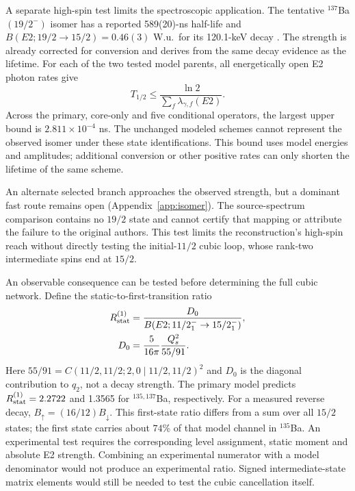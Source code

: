 \documentclass[pdflatex,iicol,sn-mathphys-num]{sn-jnl}
\begin{document}
A separate high-spin test limits the spectroscopic application.
The tentative $^{137}$Ba $(19/2^-)$ isomer has a reported
589(20)-ns half-life and $B(E2;19/2\to15/2)=0.46(3)$ W.u.\
for its 120.1-keV decay \cite{Vogt2017PRC95_024316}.
The strength is already corrected for conversion and derives from
the same decay evidence as the lifetime.
For each of the two tested model parents, all energetically open
E2 photon rates give
\begin{equation}
T_{1/2}\leq\frac{\ln2}{\sum_f\lambda_{\gamma,f}(E2)}.
\label{eq:isomerbound}
\end{equation}
Across the primary, core-only and five conditional operators,
the largest upper bound is $2.811\times10^{-4}$ ns.
The unchanged modeled schemes cannot represent the observed isomer
under these state identifications. This bound uses model energies
and amplitudes; additional conversion or other positive rates can
only shorten the lifetime of the same scheme.

An alternate selected branch approaches the observed strength,
but a dominant fast route remains open (Appendix~\ref{app:isomer}).
The source-spectrum comparison contains no $19/2$ state and cannot
certify that mapping or attribute the failure to the original authors.
This test limits the reconstruction's high-spin reach without
directly testing the initial-$11/2$ cubic loop, whose rank-two
intermediate spins end at $15/2$.

An observable consequence can be tested before determining the full cubic
network. Define the static-to-first-transition ratio
\begin{equation}
\begin{aligned}
R_{\rm stat}^{(1)}
&=\frac{D_0}{B(E2;11/2_1^-\to15/2_1^-)},\\
D_0&=\frac5{16\pi}\frac{Q_s^2}{55/91}.
\end{aligned}
\label{eq:staticratio}
\end{equation}
Here $55/91=C(11/2,11/2;2,0\mid11/2,11/2)^2$ and $D_0$ is the
diagonal contribution to $q_2$, not a decay strength.
The primary model predicts $R_{\rm stat}^{(1)}=2.2722$ and 1.3565 for
$^{135,137}$Ba, respectively. For a measured reverse decay,
$B_\uparrow=(16/12)B_\downarrow$.
This first-state ratio differs from a sum over all $15/2$ states;
the first state carries about $74\%$ of that model channel in $^{135}$Ba.
An experimental test requires the corresponding level assignment, static
moment and absolute E2 strength. Combining an experimental numerator with a
model denominator would not produce an experimental ratio.
Signed intermediate-state matrix elements would still be needed to test the
cubic cancellation itself.
\end{document}
